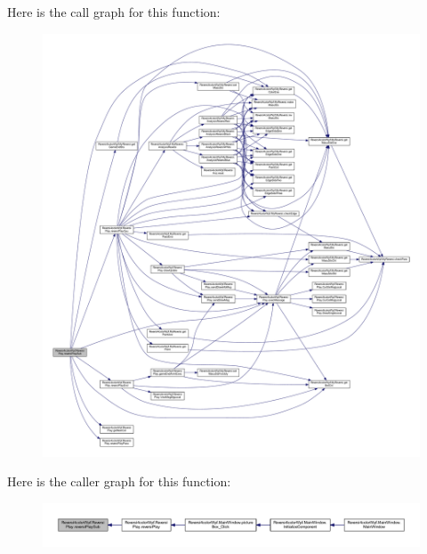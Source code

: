 Here is the call graph for this function\+:
\nopagebreak
\begin{figure}[H]
\begin{center}
\leavevmode
\includegraphics[width=350pt]{class_reversi4color_wpf_1_1_reversi_play_a44bb5fb6cfa685baef758a8129bd9d36_cgraph}
\end{center}
\end{figure}
Here is the caller graph for this function\+:
\nopagebreak
\begin{figure}[H]
\begin{center}
\leavevmode
\includegraphics[width=350pt]{class_reversi4color_wpf_1_1_reversi_play_a44bb5fb6cfa685baef758a8129bd9d36_icgraph}
\end{center}
\end{figure}
\mbox{\label{class_reversi4color_wpf_1_1_reversi_play_a503f1a56ac7547ebfb347c31ff5b7e15}} 
